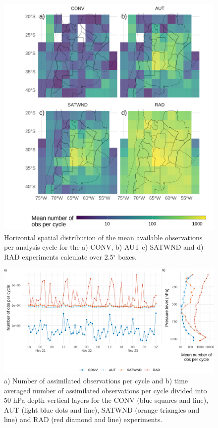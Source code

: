 \documentclass[final,5p,times,twocolumn,authoryear]{elsarticle} %
\begin{document}
\begin{figure}
\includegraphics[width=1\linewidth]{../figures/obs-horizontal-1} \caption{Horizontal spatial distribution of the mean available observations per analysis cycle for the a) CONV, b) AUT c) SATWND and d) RAD experiments calculate over 2.5\(^{\circ}\) boxes.}\label{fig:obs-horizontal}
\end{figure}



\begin{figure}
\includegraphics{../figures/obs-cycle-1} \caption{a) Number of assimilated observations per cycle and b) time averaged number of assimilated observations per cycle divided into 50 hPa-depth vertical layers for the CONV (blue squares and line), AUT (light blue dots and line), SATWND (orange triangles and line) and RAD (red diamond and line) experiments.}\label{fig:obs-cycle}
\end{figure}
\end{document}
